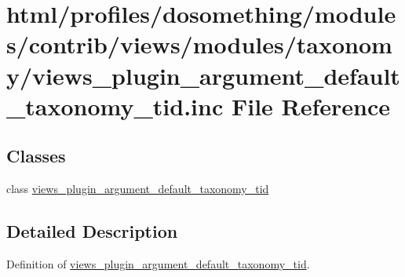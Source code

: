\hypertarget{views__plugin__argument__default__taxonomy__tid_8inc}{
\section{html/profiles/dosomething/modules/contrib/views/modules/taxonomy/views\_\-plugin\_\-argument\_\-default\_\-taxonomy\_\-tid.inc File Reference}
\label{views__plugin__argument__default__taxonomy__tid_8inc}
}
\subsection*{Classes}
\begin{DoxyCompactItemize}
\item 
class \hyperlink{classviews__plugin__argument__default__taxonomy__tid}{views\_\-plugin\_\-argument\_\-default\_\-taxonomy\_\-tid}
\end{DoxyCompactItemize}


\subsection{Detailed Description}
Definition of \hyperlink{classviews__plugin__argument__default__taxonomy__tid}{views\_\-plugin\_\-argument\_\-default\_\-taxonomy\_\-tid}. 